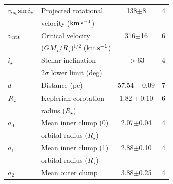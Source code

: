 \documentclass[11pt,twocolumn,tighten]{aastex7}
\newcommand{\kms}{\ensuremath{\rm km\,s^{-1}}}
\begin{document}
\begin{table}
\begin{tabular}{llcc}
%
$v_{\rm eq}\sin{i_\star}$\dotfill		    & Projected rotational\dotfill                                   &  138$\pm$8       & 4 \\
                                        & \hspace{3pt} velocity (\kms)	                                 &                      \\
%
$v_{\rm crit}$\dotfill		              & Critical velocity \dotfill                                      &  316$\pm$16      & 6 \\
                                        & \hspace{3pt} ($G M_\star / R_\star$)$^{1/2}$ (\kms)	           &                      \\
%
$i_\star$\dotfill                       & Stellar inclination\dotfill                                    & 	$>$63           & 4 \\
                                        & \hspace{3pt}  2$\sigma$ lower limit (deg)	                     &                      \\
%
$d$\dotfill                             & Distance (pc)\dotfill                                          & $57.54 \pm 0.09$ & 7 \\
%
$R_{\rm c}$\dotfill		                  & Keplerian corotation\dotfill                                   & $1.82 \pm 0.10$  & 6 \\
                                        & \hspace{3pt} radius ($R_\star$)	                               &                      \\
%
$a_0$\dotfill                           & Mean inner clump (0)\hspace{9pt}\dotfill           &  2.07$\pm$0.04   & 4 \\
                                        & \hspace{3pt} orbital radius ($R_\star$)	                       &                      \\
%
$a_1$\dotfill                           & Mean inner clump (1)\hspace{9pt}\dotfill           &  2.88$\pm$0.10   & 4 \\
                                        & \hspace{3pt} orbital radius ($R_\star$)	                       &                      \\
%
$a_2$\dotfill                           & Mean outer clump\hspace{9pt}\dotfill           &  3.88$\pm$0.25   & 4 \\

\end{tabular}
\end{table}
\end{document}
